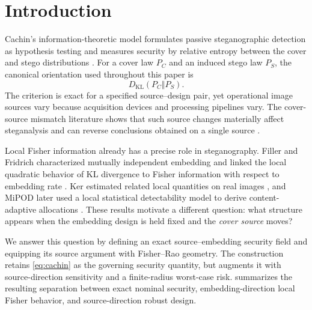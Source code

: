 \documentclass[10pt]{article}
\newcommand{\KL}{D_{\mathrm{KL}}}
\begin{document}
\section{Introduction}
Cachin's information-theoretic model formulates passive steganographic detection as hypothesis testing and measures security by relative entropy between the cover and stego distributions \cite{cachin2004}. For a cover law \(P_C\) and an induced stego law \(P_S\), the canonical orientation used throughout this paper is
\begin{equation}
  \KL(P_C\Vert P_S).
  \label{eq:cachin}
\end{equation}
The criterion is exact for a specified source--design pair, yet operational image sources vary because acquisition devices and processing pipelines vary. The cover-source mismatch literature shows that such source changes materially affect steganalysis and can reverse conclusions obtained on a single source \cite{kodovsky2011,giboulot2020,mallet2024}.

Local Fisher information already has a precise role in steganography. Filler and Fridrich characterized mutually independent embedding and linked the local quadratic behavior of KL divergence to Fisher information with respect to embedding rate \cite{filler2009icas,filler2009ih}. Ker estimated related local quantities on real images \cite{ker2009}, and MiPOD later used a local statistical detectability model to derive content-adaptive allocations \cite{sedighi2016}. These results motivate a different question: what structure appears when the embedding design is held fixed and the \emph{cover source} moves?

We answer this question by defining an exact source--embedding security field and equipping its source argument with Fisher--Rao geometry. The construction retains \cref{eq:cachin} as the governing security quantity, but augments it with source-direction sensitivity and a finite-radius worst-case risk.  summarizes the resulting separation between exact nominal security, embedding-direction local Fisher behavior, and source-direction robust design.
\end{document}
